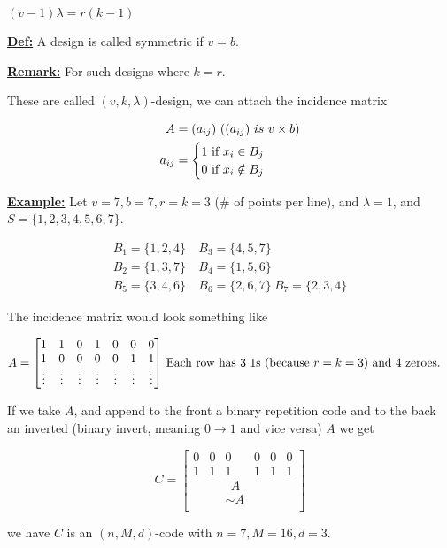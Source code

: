 \documentclass{article}
\renewcommand{\b}[1]{\textbf{#1}}
\newcommand{\ul}[1]{\underline{#1}}
\renewcommand{\aligned}[1]{
	\begin{align*}
		#1
	\end{align*}
}
\newcommand{\newdef}[2]{\b{\ul{#1:}} #2}
\begin{document}
$(v-1)\lambda = r(k-1)$

\newdef{Def}{A design is called symmetric if $v = b$.}

\newdef{Remark}{
	For such designs where $k = r$.

	These are called $(v, k, \lambda)$-design, we can attach the incidence
	matrix

	\aligned{
		A      & = (a_{ij})\ ((a_{ij})\ is\ v \times b) \\
		a_{ij} & = \begin{cases}
			1 \textnormal{ if } x_i \in B_j \\
			0 \textnormal{ if } x_i \notin B_j
		\end{cases}
	}
}

\pagebreak

\newdef{Example}{
	Let $v=7, b=7, r=k=3$ (\# of points per line), and $\lambda = 1$, and
	\newline $S = \{1, 2, 3, 4, 5, 6, 7\}$.
	\aligned{
		B_1 = \{1, 2, 4\} & \ B_3 = \{4, 5, 7\}                    \\
		B_2 = \{1, 3, 7\} & \ B_4 = \{1, 5, 6\}                    \\
		B_5 = \{3, 4, 6\} & \ B_6 = \{2, 6, 7\}\ B_7 = \{2, 3, 4\}
	}

	The incidence matrix would look something like

	\aligned{
		A = \begin{bmatrix}
			1      & 1      & 0      & 1      & 0      & 0      & 0      \\
			1      & 0      & 0      & 0      & 0      & 1      & 1      \\
			\vdots & \vdots & \vdots & \vdots & \vdots & \vdots & \vdots \\
		\end{bmatrix} & \textnormal{ Each row has 3 1s (because
			                                $r = k = 3$) and 4 zeroes.}
	}

	If we take $A$, and append to the front a binary repetition code and to
	the back an inverted (binary invert, meaning $0 \rightarrow 1$ and
	vice versa) $A$ we get

	\[
		C = \begin{bmatrix}
			0 & 0 & 0      & 0 & 0 & 0 \\
			1 & 1 & 1      & 1 & 1 & 1 \\
			  &   & \ \ A  &   &   &   \\
			  &   & \sim A &   &   &   \\
		\end{bmatrix}
	\]

	we have $C$ is an $(n, M, d)$-code with $n=7, M=16, d=3$.
}
\end{document}
